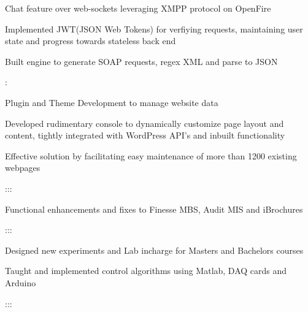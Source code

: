 \documentclass[]{hemant-style}
\begin{document}
\begin{minipage}[]{\textwidth}
\begin{minipage}{\textwidth}
\begin{minipage}[t][][c]{.75\textwidth}
\begin{hitemize}
                                \item Chat feature over web-sockets leveraging XMPP protocol on OpenFire
                                \item Implemented JWT(JSON Web Tokens) for verfiying requests, maintaining user state and progress towards stateless back end
                                \item Built engine to generate SOAP requests, regex XML and parse to JSON 
                            \end{hitemize}
                            :
                            \begin{hitemize}
                                \item Plugin and Theme Development to manage website data
                                \item Developed rudimentary console to dynamically customize page layout and content, tightly integrated with WordPress API's and inbuilt functionality
                                \item Effective solution by facilitating easy maintenance of more than 1200 existing webpages
                            \end{hitemize}
                            :::
                            \begin{hitemize}
                                \item Functional enhancements and fixes to Finesse MBS, Audit MIS and iBrochures
                            \end{hitemize}
                            :::
                            \begin{hitemize}
                                \item Designed new experiments and Lab incharge for Masters and Bachelors courses
                                \item Taught and implemented control algorithms using Matlab, DAQ cards and Arduino
                            \end{hitemize}
                            :::
                            \begin{hitemize}

\end{hitemize}
\end{minipage}
\end{minipage}
\end{minipage}
\end{document}
